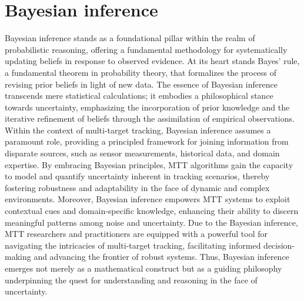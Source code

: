     \section{Bayesian inference}
Bayesian inference stands as a foundational pillar within the realm of probabilistic reasoning, offering a fundamental methodology for systematically updating beliefs in response to observed evidence. At its heart stands Bayes' rule, a fundamental theorem in probability theory, that formalizes the process of revising prior beliefs in light of new data. The essence of Bayesian inference transcends mere statistical calculations; it embodies a philosophical stance towards uncertainty, emphasizing the incorporation of prior knowledge and the iterative refinement of beliefs through the assimilation of empirical observations. Within the context of multi-target tracking, Bayesian inference assumes a paramount role, providing a principled framework for joining information from disparate sources, such as sensor measurements, historical data, and domain expertise. By embracing Bayesian principles, MTT algorithms gain the capacity to model and quantify uncertainty inherent in tracking scenarios, thereby fostering robustness and adaptability in the face of dynamic and complex environments. Moreover, Bayesian inference empowers MTT systems to exploit contextual cues and domain-specific knowledge, enhancing their ability to discern meaningful patterns among noise and uncertainty. Due to the Bayesian inference, MTT researchers and practitioners are equipped with a powerful tool for navigating the intricacies of multi-target tracking, facilitating informed decision-making and advancing the frontier of robust systems. Thus, Bayesian inference emerges not merely as a mathematical construct but as a guiding philosophy underpinning the quest for understanding and reasoning in the face of uncertainty.
